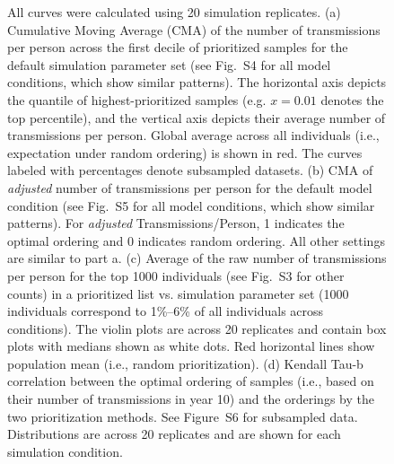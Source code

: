 \documentclass[oupdraft]{sysbio}
\newcommand{\PLWH}{sample\xspace}
\begin{document}
\begin{figure}[!tp]
{All curves were calculated using 20 simulation replicates.
(a) Cumulative Moving Average (CMA) of the number of transmissions per person across the first decile of prioritized \PLWH{s} for the default simulation parameter set (see Fig.~S4 for all model conditions, which show similar patterns).
The horizontal axis depicts the quantile of highest-prioritized \PLWH{s} (e.g. $x=0.01$ denotes the top percentile), and the vertical axis depicts their average number of transmissions per person.
Global average across all individuals (i.e., expectation under random ordering) is shown in red.
The curves labeled with percentages denote subsampled datasets.
(b) CMA of \textit{adjusted} number of transmissions per person for the default model condition (see Fig.~S5 for all model conditions, which show similar patterns). 
For \textit{adjusted} Transmissions/Person, 1 indicates the optimal ordering and 0 indicates  random ordering.
All other settings are similar to part a. 
(c) Average of the raw number of transmissions per person for the top 1000 individuals (see Fig.~S3 for other counts) in a prioritized list vs. simulation parameter set (1000 individuals correspond to 1\%--6\% of all individuals across conditions). The violin plots are across 20 replicates and contain box plots with medians shown as white dots.
Red horizontal lines show population mean (i.e., random prioritization).
(d) Kendall Tau-b correlation between the optimal ordering of \PLWH{s} (i.e., based on their number of transmissions in year 10) and the orderings by the two prioritization methods.
See Figure~S6 for subsampled data. 
Distributions are across 20 replicates and are shown for each simulation condition. 
}\label{fig:efficacy-main}
\end{figure}











\end{document}
